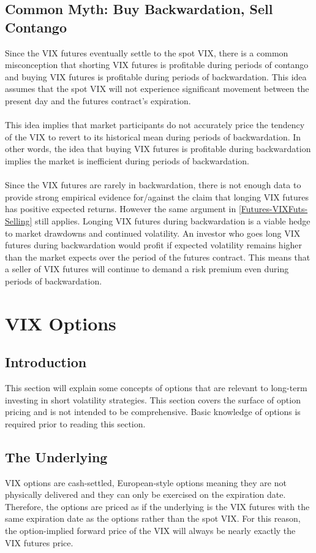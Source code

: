 \documentclass[11pt, oneside]{book}
\begin{document}
\section{Common Myth: Buy Backwardation, Sell Contango} \label{Futures-Myth}
Since the VIX futures eventually settle to the spot VIX, there is a common misconception that shorting VIX futures is profitable during periods of contango and buying VIX futures is profitable during periods of backwardation. This idea assumes that the spot VIX will not experience significant movement between the present day and the futures contract's expiration.\\
\\
This idea implies that market participants do not accurately price the tendency of the VIX to revert to its historical mean during periods of backwardation. In other words, the idea that buying VIX futures is profitable during backwardation implies the market is inefficient during periods of backwardation.\\
\\
Since the VIX futures are rarely in backwardation, there is not enough data to provide strong empirical evidence for/against the claim that longing VIX futures has positive expected returns. However the same argument in \ref{Futures-VIXFuts-Selling} still applies. Longing VIX futures during backwardation is a viable hedge to market drawdowns and continued volatility. An investor who goes long VIX futures during backwardation would profit if expected volatility remains higher than the market expects over the period of the futures contract. This means that a seller of VIX futures will continue to demand a risk premium even during periods of backwardation.

\chapter{VIX Options} \label{Options}
\section{Introduction} \label{Options-Intro}
This section will explain some concepts of options that are relevant to long-term investing in short volatility strategies. This section covers the surface of option pricing and is not intended to be comprehensive. Basic knowledge of options is required prior to reading this section.

\section{The Underlying} \label{Options-Underlying}
VIX options are cash-settled, European-style options meaning they are not physically delivered and they can only be exercised on the expiration date. Therefore, the options are priced as if the underlying is the VIX futures with the same expiration date as the options rather than the spot VIX. For this reason, the option-implied forward price of the VIX will always be nearly exactly the VIX futures price.
\end{document}
